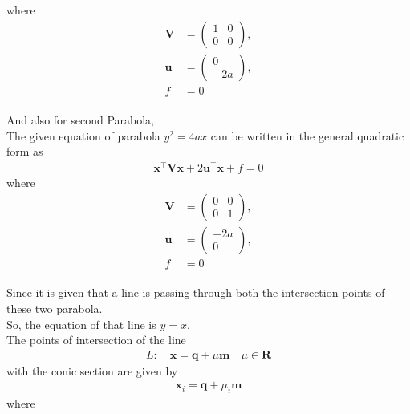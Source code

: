 \documentclass[journal,12pt,twocolumn]{IEEEtran}
\newcommand{\myvec}[1]{\ensuremath{\begin{pmatrix}#1\end{pmatrix}}}
\let\vec\mathbf
\let\vec\mathbf
\begin{document}
where
\begin{align}
 \label{eq:V_matrix}
 \vec{V} &= \myvec{1 & 0\\0 & 0},
 \\
 \label{eq:u_vector}
 \vec{u} &= \myvec{0\\-2a},
 \\
 \label{eq:f_value}
 f &= 0
\end{align}
\\
And also for second Parabola,\\
The given equation of parabola $y^2 = 4ax$ can be written in the general quadratic form as
\begin{align}
    \label{eq:conic_quad_form}
    \vec{x}^{\top}\vec{V}\vec{x}+2\vec{u}^{\top}\vec{x}+f=0
    \end{align}
where
\begin{align}
 \label{eq:V_matrix}
 \vec{V} &= \myvec{0 & 0\\0 & 1},
 \\
 \label{eq:u_vector}
 \vec{u} &= \myvec{-2a\\ 0},
 \\
 \label{eq:f_value}
 f &= 0
\end{align}
\\
Since it is given that a line is passing through both the intersection points of these two parabola.\\
So, the equation of that line is $y=x$.\\
The points of intersection of the line 
\begin{align}
 L: \quad \vec{x} = \vec{q} + \mu \vec{m} \quad \mu \in \mathbf{R}
\label{eq:conic_tangent}
\end{align}
with the conic section are given by
\begin{align}
\vec{x}_i = \vec{q} + \mu_i \vec{m}
\label{eq:conic_tangent_pts}
\end{align}
%
where
\end{document}
